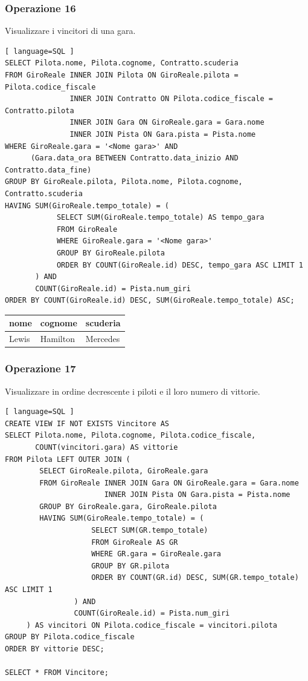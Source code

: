 \documentclass[11pt]{article}
\begin{document}
\subsubsection{Operazione 16}
Visualizzare i vincitori di una gara.
\begin{lstlisting}[ language=SQL ]
SELECT Pilota.nome, Pilota.cognome, Contratto.scuderia
FROM GiroReale INNER JOIN Pilota ON GiroReale.pilota = Pilota.codice_fiscale
               INNER JOIN Contratto ON Pilota.codice_fiscale = Contratto.pilota
               INNER JOIN Gara ON GiroReale.gara = Gara.nome
               INNER JOIN Pista ON Gara.pista = Pista.nome
WHERE GiroReale.gara = '<Nome gara>' AND
      (Gara.data_ora BETWEEN Contratto.data_inizio AND Contratto.data_fine)
GROUP BY GiroReale.pilota, Pilota.nome, Pilota.cognome, Contratto.scuderia
HAVING SUM(GiroReale.tempo_totale) = (
            SELECT SUM(GiroReale.tempo_totale) AS tempo_gara
            FROM GiroReale
            WHERE GiroReale.gara = '<Nome gara>'
            GROUP BY GiroReale.pilota
            ORDER BY COUNT(GiroReale.id) DESC, tempo_gara ASC LIMIT 1
       ) AND
       COUNT(GiroReale.id) = Pista.num_giri
ORDER BY COUNT(GiroReale.id) DESC, SUM(GiroReale.tempo_totale) ASC;
\end{lstlisting}

\begin{table}[H]
    \centering
    \begin{tabular}{|l|l|l|}
    \hline
        nome & cognome & scuderia \\ \hline
        Lewis & Hamilton & Mercedes \\ \hline
    \end{tabular}
\end{table}


\subsubsection{Operazione 17}
Visualizzare in ordine decrescente i piloti e il loro numero di vittorie.
\begin{lstlisting}[ language=SQL ]
CREATE VIEW IF NOT EXISTS Vincitore AS
SELECT Pilota.nome, Pilota.cognome, Pilota.codice_fiscale, 
       COUNT(vincitori.gara) AS vittorie
FROM Pilota LEFT OUTER JOIN (
        SELECT GiroReale.pilota, GiroReale.gara
        FROM GiroReale INNER JOIN Gara ON GiroReale.gara = Gara.nome
                       INNER JOIN Pista ON Gara.pista = Pista.nome
        GROUP BY GiroReale.gara, GiroReale.pilota
        HAVING SUM(GiroReale.tempo_totale) = (
                    SELECT SUM(GR.tempo_totale)
                    FROM GiroReale AS GR
                    WHERE GR.gara = GiroReale.gara
                    GROUP BY GR.pilota
                    ORDER BY COUNT(GR.id) DESC, SUM(GR.tempo_totale) ASC LIMIT 1
                ) AND
                COUNT(GiroReale.id) = Pista.num_giri
     ) AS vincitori ON Pilota.codice_fiscale = vincitori.pilota
GROUP BY Pilota.codice_fiscale
ORDER BY vittorie DESC;

SELECT * FROM Vincitore;
\end{lstlisting}
\end{document}
